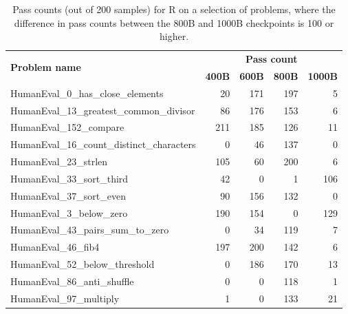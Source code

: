 \documentclass[10pt]{article} %
\begin{document}
\begin{table}[h]
    \centering
    \begin{tabular}{lrrrr}
    \toprule
        \multirow{2}{*}{\textbf{Problem name}} & \multicolumn{4}{c}{\textbf{Pass count}} \\ \cmidrule{2-5}
        &   \textbf{400B} & \textbf{600B} & \textbf{800B} & \textbf{1000B} \\ 
        \midrule
        HumanEval\_0\_has\_close\_elements & 20 & 171 & 197 & 5 \\ 
        HumanEval\_13\_greatest\_common\_divisor & 86 & 176 & 153 & 6 \\ 
        HumanEval\_152\_compare & 211 & 185 & 126 & 11 \\ 
        HumanEval\_16\_count\_distinct\_characters & 0 & 46 & 137 & 0 \\ 
        HumanEval\_23\_strlen & 105 & 60 & 200 & 6 \\ 
        HumanEval\_33\_sort\_third & 42 & 0 & 1 & 106 \\ 
        HumanEval\_37\_sort\_even & 90 & 156 & 132 & 0 \\ 
        HumanEval\_3\_below\_zero & 190 & 154 & 0 & 129 \\ 
        HumanEval\_43\_pairs\_sum\_to\_zero & 0 & 34 & 119 & 7 \\ 
        HumanEval\_46\_fib4 & 197 & 200 & 142 & 6 \\ 
        HumanEval\_52\_below\_threshold & 0 & 186 & 170 & 13 \\ 
        HumanEval\_86\_anti\_shuffle & 0 & 0 & 118 & 1 \\ 
         HumanEval\_97\_multiply & 1 & 0 & 133 & 21 \\ \bottomrule
    \end{tabular}
    \caption{Pass counts (out of 200 samples) for R on a selection of problems, where the difference in pass counts between the 800B and 1000B checkpoints is 100 or higher.}
    \label{apptab:Rcompletions}
\end{table}


\end{document}
